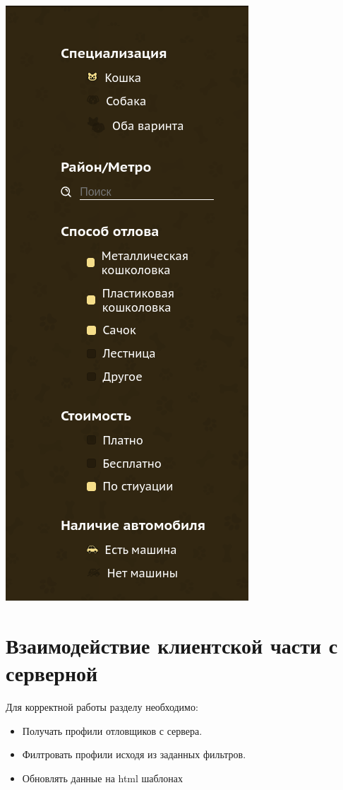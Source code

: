 \includegraphics{figures/trappers/filtr-bar.png}



\section{Взаимодействие клиентской части с серверной}

Для корректной работы разделу необходимо:
\begin{itemize}
      \item Получать профили отловщиков с сервера.
      \item Филтровать профили исходя из заданных фильтров.
      \item Обновлять данные на html шаблонах
\end{itemize}

